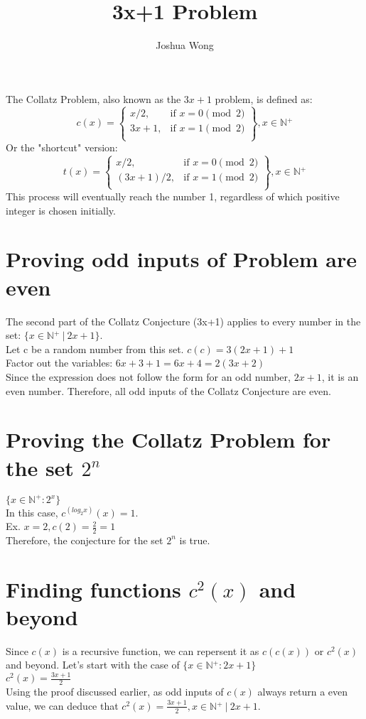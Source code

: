 \documentclass[a4paper,10pt]{article}
\title{3x+1 Problem}
\author{Joshua Wong}
\begin{document}
\maketitle
  The Collatz Problem, also known as the \(3x+1\) problem, is defined as:
  \[
    c(x) = \left.
    \begin{cases}
        x/2, & \text{if } x = 0 {\pmod {2}}\\
        3x+1, & \text{if } x = 1 {\pmod {2}} \\
        \end{cases}
    \right\}, x \in \mathbb{N{^+}}
  \]
  Or the "shortcut" version:
  \[
    t(x) = \left.
    \begin{cases}
        x/2, & \text{if } x = 0 {\pmod {2}}\\
        (3x+1)/2, & \text{if } x = 1 {\pmod {2}} \\
        \end{cases}
    \right\}, x \in \mathbb{N{^+}}
  \]
  This process will eventually reach the number 1, regardless of which positive integer is chosen initially.
  \section{Proving odd inputs of Problem are even}
  The second part of the Collatz Conjecture (3x+1) applies to every number in the set: \(\{ x \in \mathbb{N{^+}} \ | \ 2x+1 \}\). \\
  Let c be a random number from this set. \(c(c) = 3(2x+1)+1 \) \\
  Factor out the variables: \(6x+3+1 = 6x+4 = 2(3x+2)\) \\
  Since the expression does not follow the form for an odd number, \(2x+1\), it is an even number.
  Therefore, all odd inputs of the Collatz Conjecture are even.
  \section{Proving the Collatz Problem for the set $2^{n}$}
  \(\{x \in \mathbb{N{^+}}: 2{^x}\}\) \\
  In this case, \(c^{(log_2{x})}(x) = 1\). \\
  Ex. \(x = 2, c(2) = \frac{2}{2} = 1\) \\
  Therefore, the conjecture for the set $2^{n}$ is true.
  \section{Finding functions $c{^2}(x)$ and beyond}
  Since $c(x)$ is a recursive function, we can repersent it as $c(c(x))$ or $c{^2}(x)$ and beyond.
  Let's start with the case of \(\{x \in \mathbb{N{^+}} : 2x+1\}\) \\
  \(c^2(x) = \frac{3x+1}{2}\) \\
  Using the proof discussed earlier, as odd inputs of \(c(x)\) always return a even value, we can deduce that \(c^2(x) = \frac{3x+1}{2}, x \in \mathbb{N{^+}} \ | \ 2x+1\).
\end{document}
